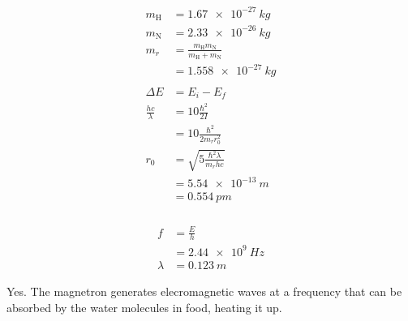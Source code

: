 \documentclass{article}
\begin{document}
\begin{align*}
  m_\text{H}          & = \qty{1.67e-27}{kg}                                    \\
  m_\text{N}          & = \qty{2.33e-26}{kg}                                    \\
  m_r                 & = \frac{m_\text{H} m_\text{N}}{m_\text{H} + m_\text{N}} \\
                      & = \qty{1.558e-27}{kg}                                   \\ \\
  \Delta E            & = E_i - E_f                                             \\
  \frac{h c}{\lambda} & = 10 \frac{\hbar^2}{2 I}                                \\
                      & = 10 \frac{\hbar^2}{2 m_r r_0^2}                        \\
  r_0                 & = \sqrt{5 \frac{\hbar^2 \lambda}{m_r h c}}              \\
                      & = \qty{5.54e-13}{m}                                     \\
                      & = \qty{0.554}{pm}
\end{align*}

\setcounter{subsubsection}{6}
\subsubsection{}

\begin{align*}
  f       & = \frac{E}{h}      \\
          & = \qty{2.44e9}{Hz} \\
  \lambda & = \qty{0.123}{m}
\end{align*}

Yes. The magnetron generates elecromagnetic waves at a frequency that can be absorbed by the water molecules in food, heating it up.

\setcounter{subsubsection}{8}
\subsubsection{}
\end{document}
